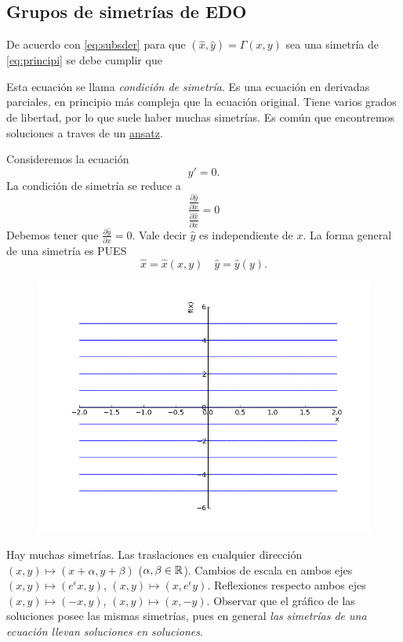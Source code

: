 \subsection{Grupos de simetrías de EDO}
 De acuerdo con \eqref{eq:subsder} para que $(\hat{x},\hat{y})=\Gamma(x,y)$ sea una simetría de \eqref{eq:principi} se debe cumplir que

 Esta ecuación se llama \emph{condición de simetría}. Es una ecuación en derivadas parciales, en principio más compleja que la ecuación original. Tiene varios grados de libertad, por lo que suele haber muchas simetrías.  Es común que encontremos soluciones a  traves de un  \href{http://es.wikipedia.org/wiki/Ansatz}{ansatz}.





 \begin{ejemplo} Consideremos la ecuación
   \begin{equation}\label{eq:trivial}y'=0.
    \end{equation}
La condición de simetría se reduce a 
\[
\frac{\frac{\partial\hat{y}}{\partial x}}{\frac{\partial\hat{x}}{\partial x}}=0
\]
Debemos tener que $\frac{\partial\hat{y}}{\partial x}=0$. Vale decir $\hat{y}$ es independiente de $x$. La forma general de una simetría es PUES
\[\hat{x}=\hat{x}(x,y)\quad \hat{y}=\hat{y}(y).\]
\end{ejemplo}


\begin{figure}
   \includegraphics[scale=.3]{imagenes/sol_trivial.png}
 \end{figure}
 Hay muchas simetrías. Las traslaciones en cualquier dirección $(x,y)\mapsto (x+\alpha ,y+\beta)$ ($\alpha,\beta\in\mathbb{R}$). Cambios de escala en ambos ejes  $(x,y)\mapsto (e^{\epsilon}x,y)$, $(x,y)\mapsto (x,e^{\epsilon}y)$. Reflexiones respecto ambos ejes  $(x,y)\mapsto (-x,y)$, $(x,y)\mapsto (x,-y)$.  Observar que el gráfico de las soluciones posee las mismas simetrías, pues en general \emph{las simetrías de una ecuación llevan soluciones en soluciones}.

